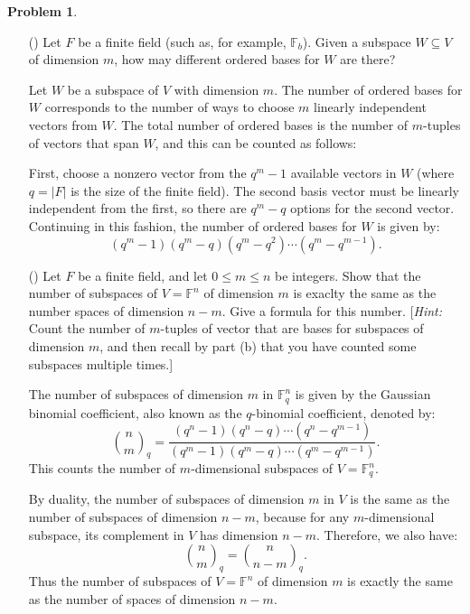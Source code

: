 \documentclass[12pt]{article}
\theoremstyle{definition}
\newtheorem{problem}{Problem}
\newcounter{subq}[problem]
\newenvironment{subproblem}
{\refstepcounter{subq} \begin{itemize} \item[(\alph{subq})]}
{\end{itemize} \medskip}
\begin{document}
\begin{problem}
    \begin{subproblem}
        Let $F$ be a finite field (such as, for example, $\mathbb{F}_b$). Given a subspace $W \subseteq V$
        of dimension $m$, how may different ordered bases for $W$ are there?
        
        \begin{solution}
            Let $W$ be a subspace of $V$ with dimension $m$. The number of ordered bases for $W$ corresponds to the number of ways to choose $m$ linearly independent vectors from $W$. The total number of ordered bases is the number of $m$-tuples of vectors that span $W$, and this can be counted as follows:

            First, choose a nonzero vector from the $q^m - 1$ available vectors in $W$ (where $q = |F|$ is the size of the finite field). The second basis vector must be linearly independent from the first, so there are $q^m - q$ options for the second vector. Continuing in this fashion, the number of ordered bases for $W$ is given by:
            \[
            (q^m - 1)(q^m - q)(q^m - q^2)\cdots(q^m - q^{m-1}).
            \]
        \end{solution}
    \end{subproblem}

    \begin{subproblem}
        Let $F$ be a finite field, and let $0 \leq m \leq n$ be integers. Show that the number of subspaces of 
        $V = \mathbb{F}^n$ of dimension $m$ is exaclty the same as the number spaces of dimension $n - m$. Give
        a formula for this number. [\textit{Hint:} Count the number of $m$-tuples of vector that are bases for
        subspaces of dimension $m$, and then recall by part (b) that you have counted some subspaces multiple times.]
        
        \begin{solution}
            The number of subspaces of dimension $m$ in $\mathbb{F}_q^n$ is given by the Gaussian binomial coefficient, also known as the $q$-binomial coefficient, denoted by:
            \[
            \binom{n}{m}_q = \frac{(q^n - 1)(q^n - q)\cdots(q^n - q^{m-1})}{(q^m - 1)(q^m - q)\cdots(q^m - q^{m-1})}.
            \]
            This counts the number of $m$-dimensional subspaces of $V = \mathbb{F}_q^n$.

            By duality, the number of subspaces of dimension $m$ in $V$ is the same as the number of subspaces of dimension $n - m$, because for any $m$-dimensional subspace, its complement in $V$ has dimension $n - m$. Therefore, we also have:
            \[
            \binom{n}{m}_q = \binom{n}{n - m}_q.
            \]
            Thus the number of subspaces of $V = \mathbb{F}^n$ of dimension $m$ is exactly the same as the number of spaces of dimension $n-m$.
        \end{solution}
    \end{subproblem}
\end{problem}
\end{document}
